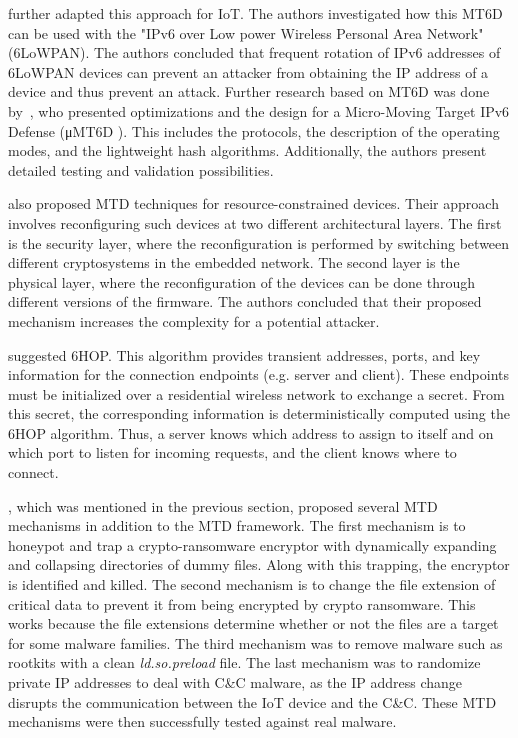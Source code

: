 \cite{article:6LowPAN} further adapted this approach for IoT. The authors investigated how this MT6D can be used with the "IPv6 over Low power Wireless Personal Area Network" (6LoWPAN). The authors concluded that frequent rotation of IPv6 addresses of 6LoWPAN devices can prevent an attacker from obtaining the IP address of a device and thus prevent an attack. Further research based on MT6D was done by~\cite{article:microMovingTarget}, who presented optimizations and the design for a Micro-Moving Target IPv6 Defense (μMT6D
). This includes the protocols, the description of the operating modes, and the lightweight hash algorithms. Additionally, the authors present detailed testing and validation possibilities.


\cite{artice:defenseApproach} also proposed MTD techniques for resource-constrained devices. Their approach involves reconfiguring such devices at two different architectural layers. The first is the security layer, where the reconfiguration is performed by switching between different cryptosystems in the embedded network. The second layer is the physical layer, where the reconfiguration of the devices can be done through different versions of the firmware. The authors concluded that their proposed mechanism increases the complexity for a potential attacker.


\cite{article:addressHopping} suggested 6HOP. This algorithm provides transient addresses, ports, and key information for the connection endpoints (e.g. server and client). These endpoints must be initialized over a residential wireless network to exchange a secret. From this secret, the corresponding information is deterministically computed using the 6HOP algorithm. Thus, a server knows which address to assign to itself and on which port to listen for incoming requests, and the client knows where to connect. 


\cite{article:vonderAssen}, which was mentioned in the previous section, proposed several MTD mechanisms in addition to the MTD framework. The first mechanism is to honeypot and trap a crypto-ransomware encryptor with dynamically expanding and collapsing directories of dummy files. Along with this trapping, the encryptor is identified and killed. The second mechanism is to change the file extension of critical data to prevent it from being encrypted by crypto ransomware. This works because the file extensions determine whether or not the files are a target for some malware families. The third mechanism was to remove malware such as rootkits with a clean \textit{ld.so.preload} file. The last mechanism was to randomize private IP addresses to deal with C\&C malware, as the IP address change disrupts the communication between the IoT device and the C\&C. These MTD mechanisms were then successfully tested against real malware.



